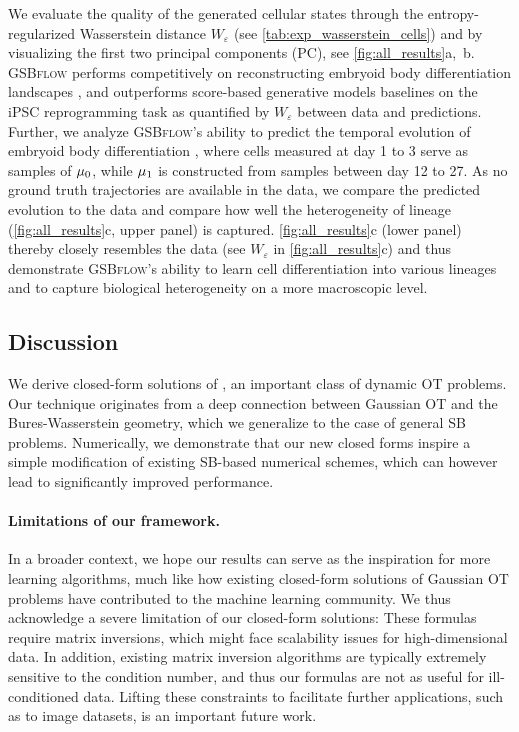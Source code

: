  We evaluate the quality of the generated cellular states through the entropy-regularized Wasserstein distance $W_\varepsilon$
(see \cref{tab:exp_wasserstein_cells}) and by visualizing the first two principal components (PC), see \cref{fig:all_results}a,~b.
\textsc{GSBflow} performs competitively on reconstructing embryoid body differentiation landscapes \citep{moon2019visualizing}, and outperforms score-based generative models baselines on the iPSC reprogramming task \citep{schiebinger2019optimal} as quantified by $W_\varepsilon$ between data and predictions.
Further, we analyze \textsc{GSBflow}'s ability to predict the temporal evolution of embryoid body differentiation \citep{moon2019visualizing}, where cells measured at day 1 to 3 serve as samples of $\mu_0$, while $\mu_1$ is constructed from samples between day 12 to 27. As no ground truth trajectories are available in the data, we compare the predicted evolution to the data and compare how well the heterogeneity of lineage (\cref{fig:all_results}c, upper panel) is captured.
\cref{fig:all_results}c (lower panel) thereby closely resembles the data (see $W_\varepsilon$ in \cref{fig:all_results}c) and thus demonstrate \textsc{GSBflow}'s ability to learn cell differentiation into various lineages and to capture biological heterogeneity on a more macroscopic level.

\subsection{Discussion}
 We derive closed-form solutions of , an important class of dynamic \acrshort{OT} problems. Our technique originates from a deep connection between Gaussian \acrshort{OT} and the Bures-Wasserstein geometry, which we generalize to the case of general \acrshort{SB} problems. Numerically, we demonstrate that our new closed forms inspire a simple modification of existing \acrshort{SB}-based numerical schemes, which can however lead to significantly improved performance.

\paragraph{Limitations of our framework.}
 In a broader context, we hope our results can serve as the inspiration for more learning algorithms, much like how existing closed-form solutions of Gaussian \acrshort{OT} problems have contributed to the machine learning community. We thus acknowledge a severe limitation of our closed-form solutions: These formulas require matrix inversions, which might face scalability issues for high-dimensional data. In addition, existing matrix inversion algorithms are typically extremely sensitive to the condition number, and thus our formulas are not as useful for ill-conditioned data. Lifting these constraints to facilitate further applications, such as to image datasets, is an important future work.
